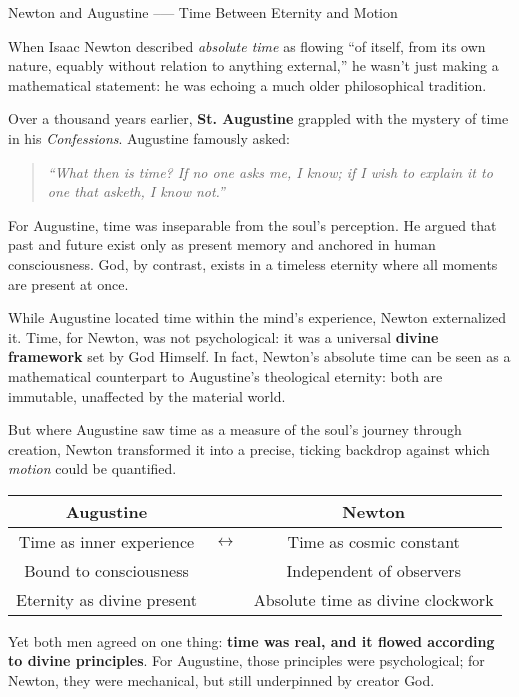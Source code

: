   \begin{HistoricalSidebar}{Newton and Augustine --— Time Between Eternity and Motion}

    When Isaac Newton described \textit{absolute time} as flowing “of itself, from its own nature, equably without relation to anything external,” he wasn’t just making a mathematical statement: he was echoing a much older philosophical tradition.

    \medskip
    
    Over a thousand years earlier, \textbf{St. Augustine} grappled with the mystery of time in his \textit{Confessions}. Augustine famously asked:
    
    \begin{quote} \textit{“What then is time? If no one asks me, I know; if I wish to explain it to one that asketh, I know not.”} \end{quote}
    
    For Augustine, time was inseparable from the soul’s perception. He argued that past and future exist only as present memory and anchored in human consciousness. God, by contrast, exists in a timeless eternity where all moments are present at once.

    \medskip
    
    While Augustine located time within the mind’s experience, Newton externalized it. Time, for Newton, was not psychological: it was a universal \textbf{divine framework} set by God Himself. In fact, Newton’s absolute time can be seen as a mathematical counterpart to Augustine’s theological eternity: both are immutable, unaffected by the material world.

    \medskip
    
    But where Augustine saw time as a measure of the soul’s journey through creation, Newton transformed it into a precise, ticking backdrop against which \textit{motion} could be quantified.

    \medskip
    
    \begin{center}
      \begin{tabular}{c c c}
      \textbf{Augustine} &  & \textbf{Newton} \\
      \hline
      Time as inner experience & $\longleftrightarrow$ & Time as cosmic constant \\
      Bound to consciousness   &                      & Independent of observers \\
      Eternity as divine present &                    & Absolute time as divine clockwork \\
      \end{tabular}
      \end{center}
    
    \medskip

    Yet both men agreed on one thing: \textbf{time was real, and it flowed according to divine principles}. For Augustine, those principles were psychological; for Newton, they were mechanical, but still underpinned by creator God.
    
  \end{HistoricalSidebar}
  

